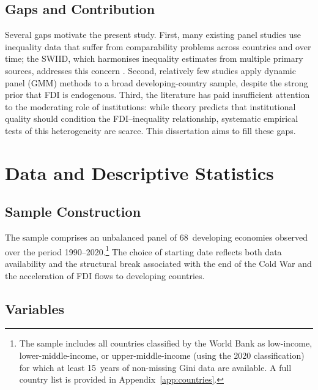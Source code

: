 \documentclass[12pt,a4paper]{article}
\begin{document}
\subsection{Gaps and Contribution}

Several gaps motivate the present study.  First, many existing panel studies use inequality data that suffer from comparability problems across countries and over time; the SWIID, which harmonises inequality estimates from multiple primary sources, addresses this concern \citep{Solt2020}.  Second, relatively few studies apply dynamic panel (GMM) methods to a broad developing-country sample, despite the strong prior that FDI is endogenous.  Third, the literature has paid insufficient attention to the moderating role of institutions: while theory predicts that institutional quality should condition the FDI--inequality relationship, systematic empirical tests of this heterogeneity are scarce.  This dissertation aims to fill these gaps.


\section{Data and Descriptive Statistics}\label{sec:data}

\subsection{Sample Construction}

The sample comprises an unbalanced panel of 68~developing economies observed over the period 1990--2020.\footnote{The sample includes all countries classified by the World Bank as low-income, lower-middle-income, or upper-middle-income (using the 2020 classification) for which at least 15~years of non-missing Gini data are available.  A full country list is provided in Appendix~\ref{app:countries}.}  The choice of starting date reflects both data availability and the structural break associated with the end of the Cold War and the acceleration of FDI flows to developing countries.

\subsection{Variables}
\end{document}
